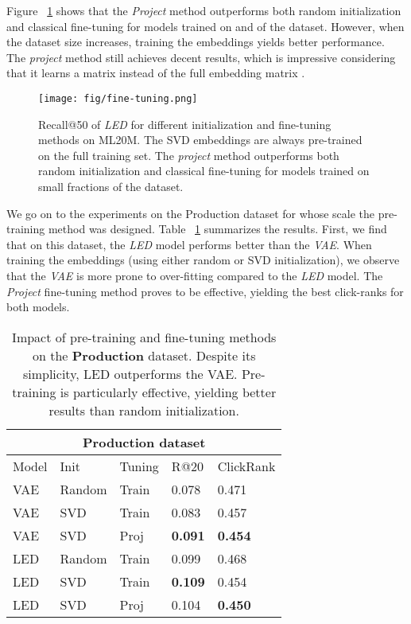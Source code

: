 \documentclass[sigconf]{acmart}
\begin{document}
Figure ~\ref{fig:fine-tuning} shows that the \emph{Project} method outperforms both random initialization and classical fine-tuning for models trained on  and  of the dataset. However, when the dataset size increases, training the embeddings yields better performance. The \emph{project} method still achieves decent results, which is impressive considering that it learns a  matrix instead of the full embedding matrix .

\begin{figure}[h!]
    \centering
    \texttt{[image: fig/fine-tuning.png]}
    \caption{Recall@50 of \emph{LED} for different initialization and fine-tuning methods on ML20M. The SVD embeddings are always pre-trained on the full training set. The \emph{project} method outperforms both random initialization and classical fine-tuning for models trained on small fractions of the dataset.}
    \label{fig:fine-tuning}
\end{figure}

We go on to the experiments on the Production dataset for whose scale the pre-training method was designed. Table ~\ref{table:results-fine-tuning-products} summarizes the results. First, we find that on this dataset, the \emph{LED} model performs better than the \emph{VAE}. When training the embeddings (using either random or SVD initialization), we observe that the \emph{VAE} is more prone to over-fitting compared to the \emph{LED} model. The \emph{Project} fine-tuning method proves to be effective, yielding the best click-ranks for both models.


\begin{table}[h]
\centering
\caption{Impact of pre-training and fine-tuning methods on the \textbf{Production} dataset. Despite its simplicity, LED outperforms the VAE. Pre-training is particularly effective, yielding better results than random initialization.}
\label{table:results-fine-tuning-products}
\begin{tabularx}{.49\textwidth}{|X|X|X|l|l|}
  \hline
    \multicolumn{5}{|c|}{Production dataset} \\
  \hline
    Model & Init & Tuning  & R@20 & ClickRank \\
  \hline
    VAE & Random & Train & 0.078 & 0.471 \\
    VAE & SVD & Train & 0.083 & 0.457 \\
    VAE & SVD & Proj & \textbf{0.091} &\textbf{0.454} \\
  \hline
    LED & Random & Train & 0.099 & 0.468 \\
    LED & SVD & Train & \textbf{0.109} & 0.454 \\
    LED & SVD & Proj & 0.104 & \textbf{0.450} \\
  \hline
    \end{tabularx}
\end{table}
\end{document}
